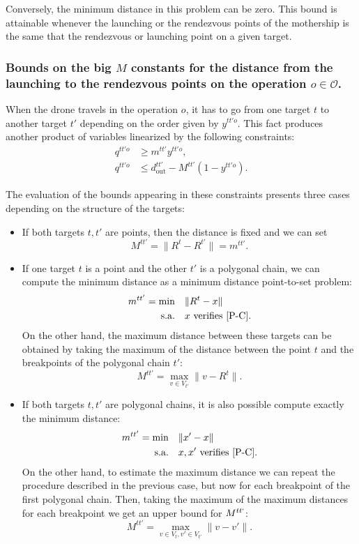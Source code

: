 \documentclass{itor}
\theoremstyle{definition}
\theoremstyle{remark}
\begin{document}
Conversely, the minimum distance in this problem can be zero. This bound is attainable whenever the launching or the rendezvous points of the mothership is the same that the rendezvous or launching point on a given  target.

\subsubsection*{Bounds on the big $M$ constants for the distance from the launching to the rendezvous points on the operation $o\in \mathcal{O}$.} When the drone travels in the operation $o$, it has to go from one target $t$ to another target $t'$ depending on the order given by $y^{tt'o}$. This fact produces another product of variables linearized by the following constraints:
\begin{align*}
q^{tt'o} & \geq m^{tt'} y^{tt'o}, \\
q^{tt'o} & \leq d^{tt'}_{\text{out}} - M^{tt'}(1-y^{tt'o}).
\end{align*}

\noindent
The evaluation of the bounds appearing in these constraints presents three cases depending on the structure of the targets:
\begin{itemize}
    \item If both targets $t, t'$ are points, then the distance is fixed and we can set
    $$M^{tt'} = \|R^t - R^{t'}\| = m^{tt'}.$$
    \item If one target $t$ is a point and the other $t'$ is a polygonal chain, we can compute the minimum distance as a minimum distance point-to-set problem:
    \begin{align*}
        m^{tt'} = \text{min} &\quad\|R^{t}- x\| \\
                  \text{s.a.} &\quad x\text{ verifies }\eqref{P-C}.
    \end{align*}
    On the other hand, the maximum distance between these targets can be obtained by taking the maximum of the distance between the point $t$ and the breakpoints of the polygonal chain $t'$:
    $$M^{tt'} = \max_{v\in V_{t'}}{\|v - R^t\|}.$$
    \item If both targets $t, t'$ are polygonal chains, it is also possible compute exactly the minimum distance:
    \begin{align*}
        m^{tt'} = \text{min} &\quad\|x'- x\| \\
                  \text{s.a.} &\quad x, x'\text{ verifies }\eqref{P-C}. 
    \end{align*}
    On the other hand, to estimate the maximum distance we can repeat the procedure described in the previous case, but now for each breakpoint of the first polygonal chain. Then, taking the maximum of the maximum distances for each breakpoint we get an upper bound for $M^{tt`}$:
    $$M^{tt'} = \max_{v\in V_{t}, v'\in V_{t'}}{\|v - v'\|}.$$
    
\end{itemize}
\end{document}
